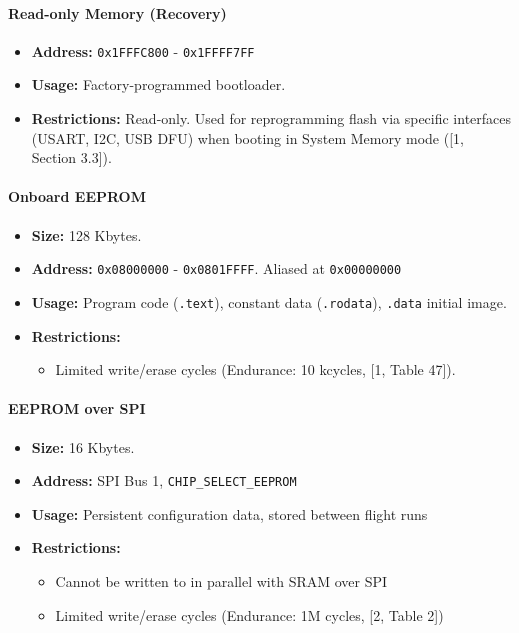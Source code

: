 \documentclass[12pt]{article}
\begin{document}
\paragraph{Read-only Memory (Recovery)}
\begin{itemize}
    \item \textbf{Address:} \texttt{0x1FFFC800} - \texttt{0x1FFFF7FF}
    \item \textbf{Usage:} Factory-programmed bootloader.
    \item \textbf{Restrictions:} Read-only. Used for reprogramming flash via specific interfaces (USART, I2C, USB DFU) when booting in System Memory mode ([1, Section 3.3]).
\end{itemize}
\paragraph{Onboard EEPROM}
\begin{itemize}
    \item \textbf{Size:} 128 Kbytes.
    \item \textbf{Address:} \texttt{0x08000000} - \texttt{0x0801FFFF}. Aliased at \texttt{0x00000000}
    \item \textbf{Usage:} Program code (\texttt{.text}), constant data (\texttt{.rodata}), \texttt{.data} initial image.
    \item \textbf{Restrictions:}
    \begin{itemize}
        \item Limited write/erase cycles (Endurance: 10 kcycles, [1, Table 47]).
    \end{itemize}
\end{itemize}
\paragraph{EEPROM over SPI}
\begin{itemize}
    \item \textbf{Size:} 16 Kbytes.
    \item \textbf{Address:} SPI Bus 1, \verb|CHIP_SELECT_EEPROM|
    \item \textbf{Usage:} Persistent configuration data, stored between flight runs
    \item \textbf{Restrictions:}
    \begin{itemize}
        \item Cannot be written to in parallel with SRAM over SPI
        \item Limited write/erase cycles (Endurance: 1M cycles, [2, Table 2])
    \end{itemize}
\end{itemize}
\end{document}
